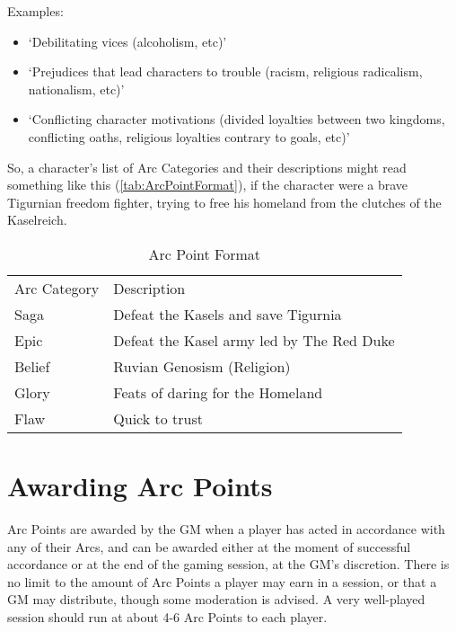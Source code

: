 \documentclass[oneside,11pt,english]{book}
\begin{document}
Examples:
\begin{itemize}
\item ‘Debilitating vices (alcoholism, etc)’ 
\item ‘Prejudices that lead characters to trouble (racism, religious radicalism, nationalism, etc)’ 
\item ‘Conflicting character motivations (divided loyalties between two kingdoms, conflicting oaths, 
religious loyalties contrary to goals, etc)’ 
\end{itemize}
So, a character’s list of Arc Categories and their descriptions might read something like this (\autoref{tab:ArcPointFormat}), if the 
character were a brave Tigurnian freedom fighter, trying to free his homeland from the clutches of the 
Kaselreich.
\begin{table}[!h]
	\centering
	\caption{Arc Point Format}
	\label{tab:ArcPointFormat}
	\begin{tabu} spread 0pt{X[-1,c]X}
Arc Category & Description\\ 
Saga&Defeat the Kasels and save Tigurnia \\
Epic &Defeat the Kasel army led by The Red Duke \\
Belief&Ruvian Genosism (Religion) \\
Glory &Feats of daring for the Homeland \\
Flaw&Quick to trust \\
	\end{tabu}
\end{table}

\section{Awarding Arc Points} %
Arc Points are awarded by the GM when a player has acted in accordance with any of their Arcs, and can 
be awarded either at the moment of successful accordance or at the end of the gaming session, at the 
GM’s discretion. There is no limit to the amount of Arc Points a player may earn in a session, or that a 
GM may distribute, though some moderation is advised. A very well-played session should run at about 
4-6 Arc Points to each player. 
\end{document}
